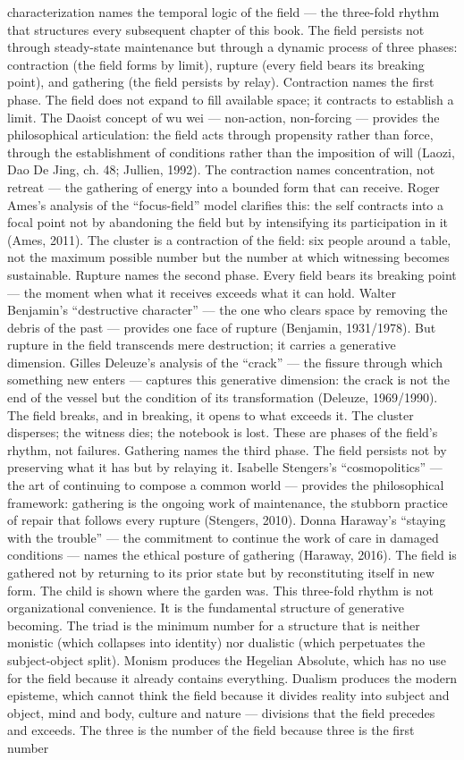 characterization names the temporal logic of the field — the three-fold rhythm that structures every subsequent chapter of this book. The field persists not through steady-state maintenance but through a dynamic process of three phases: contraction (the field forms by limit), rupture (every field bears its breaking point), and gathering (the field persists by relay). Contraction names the first phase. The field does not expand to fill available space; it contracts to establish a limit. The Daoist concept of wu wei — non-action, non-forcing — provides the philosophical articulation: the field acts through propensity rather than force, through the establishment of conditions rather than the imposition of will (Laozi, Dao De Jing, ch. 48; Jullien, 1992). The contraction names concentration, not retreat — the gathering of energy into a bounded form that can receive. Roger Ames’s analysis of the “focus-field” model clarifies this: the self contracts into a focal point not by abandoning the field but by intensifying its participation in it (Ames, 2011). The cluster is a contraction of the field: six people around a table, not the maximum possible number but the number at which witnessing becomes sustainable. Rupture names the second phase. Every field bears its breaking point — the moment when what it receives exceeds what it can hold. Walter Benjamin’s “destructive character” — the one who clears space by removing the debris of the past — provides one face of rupture (Benjamin, 1931/1978). But rupture in the field transcends mere destruction; it carries a generative dimension. Gilles Deleuze’s analysis of the “crack” — the fissure through which something new enters — captures this generative dimension: the crack is not the end of the vessel but the condition of its transformation (Deleuze, 1969/1990). The field breaks, and in breaking, it opens to what exceeds it. The cluster disperses; the witness dies; the notebook is lost. These are phases of the field’s rhythm, not failures. Gathering names the third phase. The field persists not by preserving what it has but by relaying it. Isabelle Stengers’s “cosmopolitics” — the art of continuing to compose a common world — provides the philosophical framework: gathering is the ongoing work of maintenance, the stubborn practice of repair that follows every rupture (Stengers, 2010). Donna Haraway’s “staying with the trouble” — the commitment to continue the work of care in damaged conditions — names the ethical posture of gathering (Haraway, 2016). The field is gathered not by returning to its prior state but by reconstituting itself in new form. The child is shown where the garden was. This three-fold rhythm is not organizational convenience. It is the fundamental structure of generative becoming. The triad is the minimum number for a structure that is neither monistic (which collapses into identity) nor dualistic (which perpetuates the subject-object split). Monism produces the Hegelian Absolute, which has no use for the field because it already contains everything. Dualism produces the modern episteme, which cannot think the field because it divides reality into subject and object, mind and body, culture and nature — divisions that the field precedes and exceeds. The three is the number of the field because three is the first number 